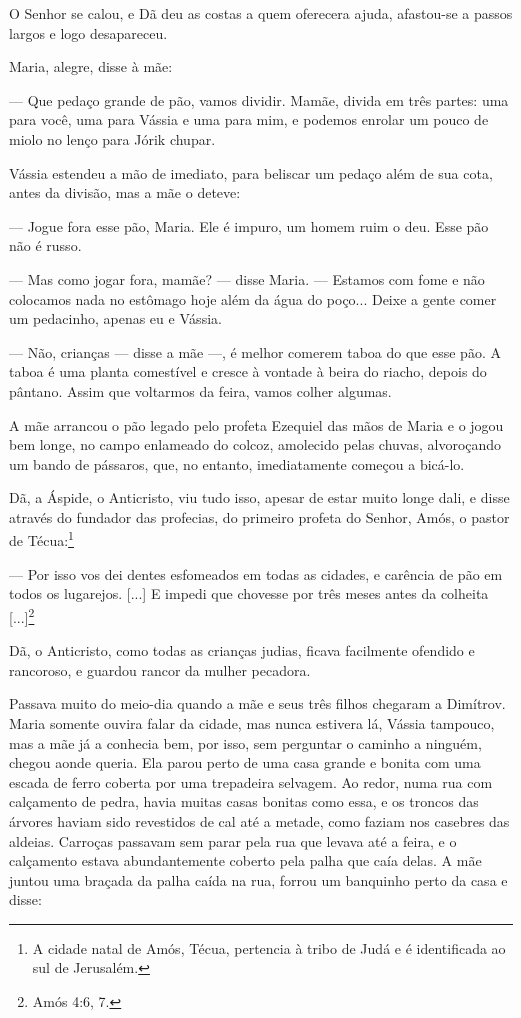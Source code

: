O Senhor se calou, e Dã deu as costas a quem oferecera ajuda, afastou-se
a passos largos e logo desapareceu.

Maria, alegre, disse à mãe:

--- Que pedaço grande de pão, vamos dividir. Mamãe, divida em três
partes: uma para você, uma para Vássia e uma para mim, e podemos enrolar
um pouco de miolo no lenço para Jórik chupar.

Vássia estendeu a mão de imediato, para beliscar um pedaço além de sua
cota, antes da divisão, mas a mãe o deteve:

--- Jogue fora esse pão, Maria. Ele é impuro, um homem ruim o deu. Esse
pão não é russo.

--- Mas como jogar fora, mamãe? --- disse Maria. --- Estamos com fome e
não colocamos nada no estômago hoje além da água do poço... Deixe a
gente comer um pedacinho, apenas eu e Vássia.

--- Não, crianças --- disse a mãe ---, é melhor comerem taboa do que
esse pão. A taboa é uma planta comestível e cresce à vontade à beira do
riacho, depois do pântano. Assim que voltarmos da feira, vamos colher
algumas.

A mãe arrancou o pão legado pelo profeta Ezequiel das mãos de Maria e o
jogou bem longe, no campo enlameado do colcoz, amolecido pelas chuvas,
alvoroçando um bando de pássaros, que, no entanto, imediatamente começou
a bicá-lo.

Dã, a Áspide, o Anticristo, viu tudo isso, apesar de estar muito longe
dali, e disse através do fundador das profecias, do primeiro profeta do
Senhor, Amós, o pastor de Técua:\footnote{A cidade natal de Amós, Técua,
  pertencia à tribo de Judá e é identificada ao sul de Jerusalém.}

--- Por isso vos dei dentes esfomeados em todas as cidades, e carência
de pão em todos os lugarejos. {[}...{]} E impedi que chovesse por três
meses antes da colheita {[}...{]}\footnote{Amós 4:6, 7.}

Dã, o Anticristo, como todas as crianças judias, ficava facilmente
ofendido e rancoroso, e guardou rancor da mulher pecadora.

Passava muito do meio-dia quando a mãe e seus três filhos chegaram a
Dimítrov. Maria somente ouvira falar da cidade, mas nunca estivera lá,
Vássia tampouco, mas a mãe já a conhecia bem, por isso, sem perguntar o
caminho a ninguém, chegou aonde queria. Ela parou perto de uma casa
grande e bonita com uma escada de ferro coberta por uma trepadeira
selvagem. Ao redor, numa rua com calçamento de pedra, havia muitas casas
bonitas como essa, e os troncos das árvores haviam sido revestidos de
cal até a metade, como faziam nos casebres das aldeias. Carroças
passavam sem parar pela rua que levava até a feira, e o calçamento
estava abundantemente coberto pela palha que caía delas. A mãe juntou
uma braçada da palha caída na rua, forrou um banquinho perto da casa e
disse:

